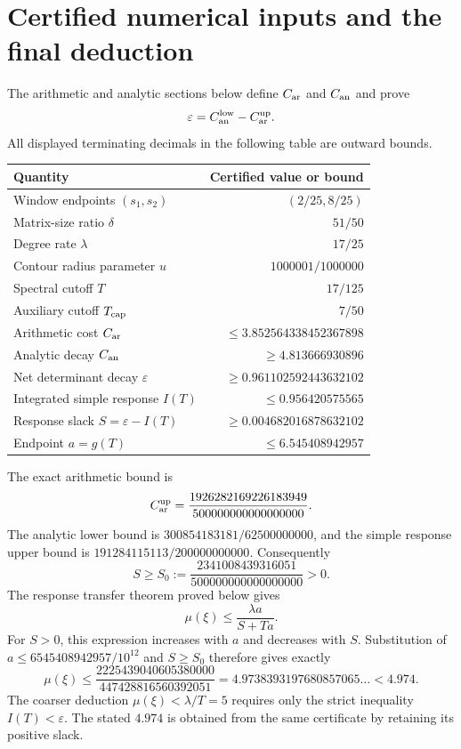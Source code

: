 \documentclass[11pt]{article}
\theoremstyle{definition}\newtheorem{definition}[theorem]{Definition}
\theoremstyle{remark}\newtheorem{remark}[theorem]{Remark}
\begin{document}
\section{Certified numerical inputs and the final deduction}\label{sec:certificate}
The arithmetic and analytic sections below define $C_{\rm ar}$ and $C_{\rm an}$ and prove
\[
 \varepsilon=C_{\rm an}^{\rm low}-C_{\rm ar}^{\rm up}.
\]
All displayed terminating decimals in the following table are outward bounds.
\begin{center}
\begin{tabular}{@{}p{.45\linewidth}r@{}}
\toprule
Quantity & Certified value or bound\\
\midrule
Window endpoints $(s_1,s_2)$ & $(2/25,8/25)$\\
Matrix-size ratio $\delta$ & $51/50$\\
Degree rate $\lambda$ & $17/25$\\
Contour radius parameter $u$ & $1000001/1000000$\\
Spectral cutoff $T$ & $17/125$\\
Auxiliary cutoff $T_{\rm cap}$ & $7/50$\\
Arithmetic cost $C_{\rm ar}$ & $\le3.852564338452367898$\\
Analytic decay $C_{\rm an}$ & $\ge4.813666930896$\\
Net determinant decay $\varepsilon$ & $\ge0.961102592443632102$\\
Integrated simple response $I(T)$ & $\le0.956420575565$\\
Response slack $S=\varepsilon-I(T)$ & $\ge0.004682016878632102$\\
Endpoint $a=g(T)$ & $\le6.545408942957$\\
\bottomrule
\end{tabular}
\end{center}
The exact arithmetic bound is
\[
 C_{\rm ar}^{\rm up}
 =\frac{1926282169226183949}{500000000000000000}.
\]
The analytic lower bound is $300854183181/62500000000$, and the simple response upper bound is $191284115113/200000000000$. Consequently
\[
 S\ge S_0:=\frac{2341008439316051}{500000000000000000}>0.
\]
The response transfer theorem proved below gives
\[
 \mu(\xi)\le\frac{\lambda a}{S+Ta}.
\]
For $S>0$, this expression increases with $a$ and decreases with $S$. Substitution of $a\le6545408942957/10^{12}$ and $S\ge S_0$ therefore gives exactly
\[
 \mu(\xi)\le
 \frac{2225439040605380000}{447428816560392051}
 =4.9738393197680857065\ldots<4.974.
\]
The coarser deduction $\mu(\xi)<\lambda/T=5$ requires only the strict inequality $I(T)<\varepsilon$. The stated $4.974$ is obtained from the same certificate by retaining its positive slack.
\end{document}
